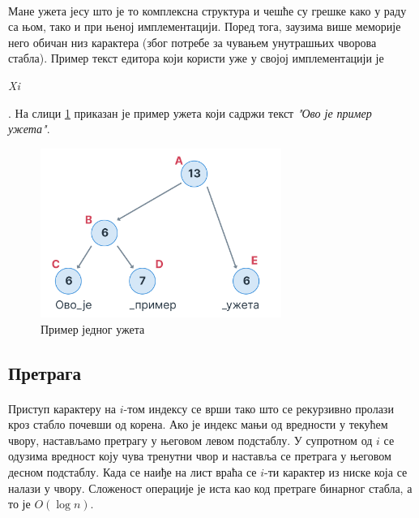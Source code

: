 \documentclass[12pt,oneside]{memoir}
\begin{document}
\paragraph{}
Мане ужета јесу што је то комплексна структура и чешће су грешке како у раду са њом,
тако и при њеној имплементацији. Поред тога, заузима више меморије него обичан низ
карактера (због потребе за чувањем унутрашњих чворова стабла). Пример текст едитора који
користи уже у својој имплементацији је \begin{latinica}\textit{Xi}\end{latinica} \cite{Xi}.
На слици \ref{fig:rope_example} приказан је пример ужета који садржи текст 
\textit{"Ово је пример ужета"}.

\begin{figure}[!ht]
	\centering
	\includegraphics[width=0.7\textwidth]{images/rope_example.png}
	\caption{Пример једног ужета}
	\label{fig:rope_example}
\end{figure}

\subsection{Претрага}
\paragraph{}
Приступ карактеру на \(i\)-том  индексу се врши тако што се рекурзивно пролази кроз стабло 
почевши од корена. Ако је индекс мањи од вредности у текућем чвору, настављамо претрагу у његовом левом подстаблу. У супротном од \(i\) се одузима вредност коју чува тренутни 
чвор и наставља се претрага у његовом десном подстаблу. Када се наиђе на лист враћа се
\(i\)-ти карактер из ниске која се налази у чвору. Сложеност операције је иста као код
претраге бинарног стабла, а то је \(O(\log{}n)\). 
\end{document}
